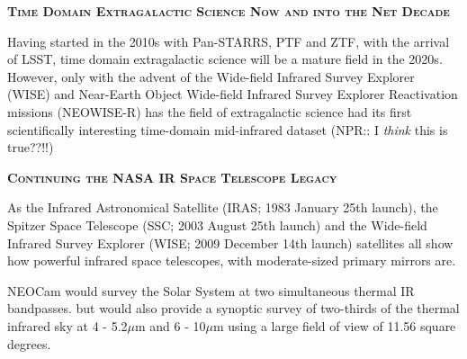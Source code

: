 \documentclass[12pt]{article}
\begin{document}
\smallskip
\smallskip
\noindent
{\bfseries \textsc{\textcolor{Cerulean}{Time Domain Extragalactic Science Now and into the Net Decade}}}

\smallskip
\noindent
Having started in the 2010s with Pan-STARRS, PTF and ZTF, with the arrival of LSST, time domain extragalactic science will be a mature field in the 2020s. However, only with the advent of the Wide-field Infrared Survey Explorer (WISE) and Near-Earth Object Wide-field Infrared Survey Explorer Reactivation missions (NEOWISE-R) has the field of extragalactic science had its first scientifically interesting time-domain mid-infrared dataset (NPR:: I {\it think} this is true??!!)


\smallskip
\smallskip
\noindent
{\bfseries \textsc{\textcolor{Cerulean}{Continuing the NASA IR Space Telescope Legacy}}} 

\smallskip
\noindent
As the Infrared Astronomical Satellite (IRAS; 1983 January 25th launch), 
the Spitzer Space Telescope (SSC; 2003 August 25th launch) and the Wide-field
Infrared Survey Explorer (WISE; 2009 December 14th launch) satellites all show 
how powerful infrared space telescopes, with moderate-sized primary mirrors are.

\smallskip
\smallskip
\noindent
NEOCam would survey the Solar System at two simultaneous thermal IR bandpasses. 
but would also provide a synoptic survey of two-thirds of the thermal infrared sky at 4 - 5.2$\mu$m and  6 - 10$\mu$m using a large field of view of 11.56 square degrees. 



\end{document}
